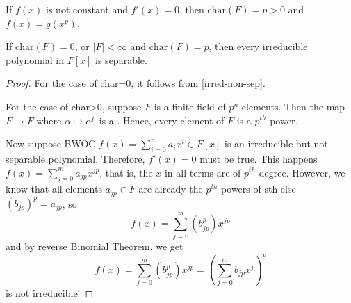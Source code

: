\documentclass[12pt]{article}
\begin{document}

If $f(x)$ is not constant and $f'(x)=0$, then $\mathrm{char} (F)=p>0$ and $f(x)=g(x^p)$.

\begin{proposition}
    If $\mathrm{char}(F)=0$, or $|F|<\infty$ and $\mathrm{char}(F)=p $, then every irreducible polynomial in $F[x]$ is separable.
\end{proposition}
\begin{proof}
    For the case of char=0, it follows from \ref{irred-non-sep}.

    For the case of char>0, suppose $F$ is a finite field of $p^n$ elements. Then the map $F\to F$ where $\alpha\mapsto \alpha^p$ is a . Hence, every element of $F$ is a $p^{th}$ power.

    Now suppose BWOC $f(x)=\sum_{i=0}^{n}a_ix^i\in F[x]$ is an irreducible but not separable polynomial. Therefore, $f'(x)=0$ must be true. This happens \ifnif $f(x)=\sum_{j=0}^{m}a_{jp}x^{jp}$, that is, the $x$ in all terms are of $p^{th}$ degree. However, we know that all elements $a_{jp}\in F$ are already the $p^{th}$ powers of sth else $(b_{jp})^p=a_{jp}$, so $$f(x)=\sum_{j=0}^{m}(b_{jp}^p)x^{jp}$$ and by reverse Binomial Theorem, we get $$f(x)=\sum_{j=0}^{m}(b_{jp}^p)x^{jp}=\left(\sum_{j=0}^{m}b_{jp}x^j\right)^p$$ is not irreducible!
\end{proof}


\end{document}
